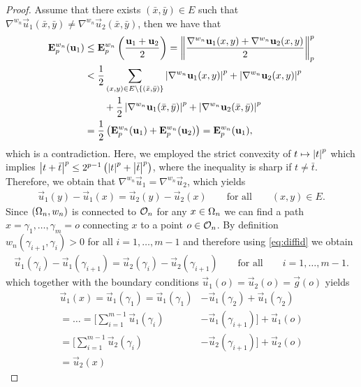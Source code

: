 \begin{proof}
Assume that there exists $(\bar x,\bar y)\in E$ such that $\nabla^{w_n} \vec u_1(\bar x,\bar y)\neq \nabla^{w_n}\vec u_2(\bar x,\bar y)$, then we have that
%
\begin{align*}
\mathbf{E}^{w_n}_p (\mathbf{u}_1) &\leq \mathbf{E}^{w_n}_p \left(\frac{\mathbf{u}_1 + \mathbf{u}_2}{2}\right) =
\left\|\frac{\nabla^{w_n} \mathbf{u}_1(x,y) + \nabla^{w_n} \mathbf{u}_2(x,y)}{2}\right\|^p_p\\
&<
\frac{1}{2} \sum_{(x,y)\in E\setminus\{(\bar x,\bar y)\}} \left|\nabla^{w_n} \mathbf{u}_1(x,y)\right|^p + \left|\nabla^{w_n} \mathbf{u}_2(x,y)\right|^p
\\ 
&\qquad+\frac{1}{2} \left|\nabla^{w_n} \mathbf{u}_1(\bar x, \bar y)\right|^p + \left|\nabla^{w_n} \mathbf{u}_2(\bar x, \bar y)\right|^p\\
&= 
\frac{1}{2}\left(\mathbf{E}^{w_n}_p (\mathbf{u}_1) + \mathbf{E}^{w_n}_p (\mathbf{u}_2)\right) 
= \mathbf{E}^{w_n}_p (\mathbf{u}_1),
\end{align*}
%
which is a contradiction. Here, we employed the strict convexity of $t\mapsto \left|t\right|^p$ which implies $\left|t+\bar t\right|^p \leq 2^{p-1} \left(\left|t\right|^p + \left|\bar t\right|^{p}\right)$, where the inequality is sharp if $t\neq \bar t$. Therefore, we obtain that $\nabla^{w_n} \vec u_1 = \nabla^{w_n}\vec u_2$, which yields
%
\begin{align}\label{eq:diffid}
\vec u_1(y) - \vec u_1(x) = \vec u_2(y) - \vec u_2(x) \qquad\text{for all}\qquad (x,y)\in E.
\end{align}
%
Since $(\Omega_n, w_n)$ is connected to $\mathcal{O}_n$ for any $x\in\Omega_n$ we can find a path $x=\gamma_1,\ldots,\gamma_m=o$ connecting $x$ to a point $o\in\mathcal{O}_n$. By definition $w_n(\gamma_{i+1}, \gamma_i) >0$ for all $i=1,\ldots, m-1$ and therefore using \cref{eq:diffid} we obtain
%
\begin{align*}
\vec u_1(\gamma_{i}) - \vec u_1(\gamma_{i+1}) = \vec u_2(\gamma_{i}) - \vec u_2(\gamma_{i+1}) \qquad\text{for all}\qquad i=1,\ldots,m-1.
\end{align*}
%
which together with the boundary conditions $\vec u_1(o)=\vec u_2(o)=\vec g(o)$ yields
%
\begin{align*}
\vec u_1(x) = 
\vec u_1(\gamma_1)= \vec u_1(\gamma_1) &- \vec u_1(\gamma_2) + \vec u_1(\gamma_2)\\
%
=\ldots=\Bigg[\sum_{i=1}^{m-1} \vec u_1(\gamma_{i}) &- \vec u_1(\gamma_{i+1})\Bigg] + 
\vec u_1(o)\\
= \Bigg[\sum_{i=1}^{m-1} \vec u_2(\gamma_{i}) &- \vec u_2(\gamma_{i+1})\Bigg] + 
\vec u_2(o)\\
%
=\vec u_2(x)\phantom{---}&
\end{align*}

\end{proof}
